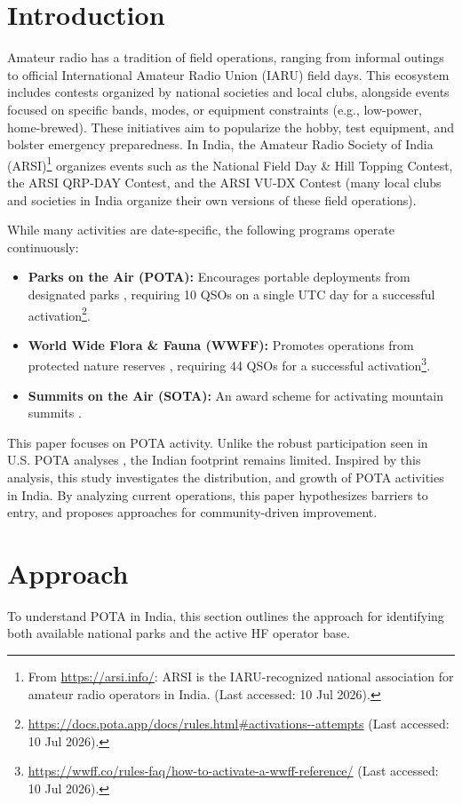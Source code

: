 \documentclass[conference]{IEEEtran}
\begin{document}
\section{Introduction}
Amateur radio has a tradition of field operations, ranging from
informal outings to official International Amateur Radio Union (IARU)
field days. This ecosystem includes contests organized by national
societies and local clubs, alongside events focused on specific bands,
modes, or equipment constraints (e.g., low-power, home-brewed). These
initiatives aim to popularize the hobby, test equipment, and bolster
emergency preparedness. In India, the Amateur Radio Society of India
(ARSI)\footnote{From \url{https://arsi.info/}: ARSI is the
  IARU-recognized national association for amateur radio operators in
  India. (Last accessed: 10 Jul 2026).} organizes events such as the
National Field Day \& Hill Topping Contest, the ARSI QRP-DAY Contest,
and the ARSI VU-DX Contest (many local clubs and societies in India
organize their own versions of these field operations).

While many activities are date-specific, the following programs
operate continuously:
\begin{itemize}
    \item \textbf{Parks on the Air (POTA):} Encourages portable
      deployments from designated parks \cite{b7}, requiring 10 QSOs
      on a single UTC day for a successful
      activation\footnote{\url{https://docs.pota.app/docs/rules.html\#activations--attempts}
        (Last accessed: 10 Jul 2026).}.
    \item \textbf{World Wide Flora \& Fauna (WWFF):} Promotes
      operations from protected nature reserves \cite{b8}, requiring
      44 QSOs for a successful
      activation\footnote{\url{https://wwff.co/rules-faq/how-to-activate-a-wwff-reference/}
        (Last accessed: 10 Jul 2026).}.
    \item \textbf{Summits on the Air (SOTA):} An award scheme for
      activating mountain summits \cite{b9}.
\end{itemize}

This paper focuses on POTA activity. Unlike the robust participation
seen in U.S. POTA analyses \cite{b1}, the Indian footprint remains
limited. Inspired by this analysis, this study investigates the
distribution, and growth of POTA activities in India. By analyzing
current operations, this paper hypothesizes barriers to entry, and
proposes approaches for community-driven improvement.

\section{Approach}
\label{sec:methodology}
To understand POTA in India, this section outlines the approach for
identifying both available national parks and the active HF operator
base.
\end{document}
